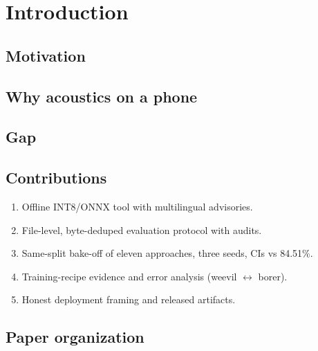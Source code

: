 \section{Introduction}
\label{sec:intro}

\subsection{Motivation}

\subsection{Why acoustics on a phone}

\subsection{Gap}

\subsection{Contributions}
\begin{enumerate}[leftmargin=*]
  \item Offline INT8/ONNX tool with multilingual advisories.
  \item File-level, byte-deduped evaluation protocol with audits.
  \item Same-split bake-off of eleven approaches, three seeds, CIs vs 84.51\%.
  \item Training-recipe evidence and error analysis (weevil $\leftrightarrow$ borer).
  \item Honest deployment framing and released artifacts.
\end{enumerate}

\subsection{Paper organization}
